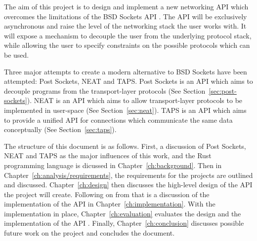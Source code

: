 \documentclass{l4proj}
\begin{document}
The aim of this project is to design and implement a new networking API which overcomes the limitations of the BSD
Sockets API .
The API will be exclusively asynchronous and raise the level of the networking stack the user works with.
It will expose a mechanism to decouple the user from the underlying protocol stack, while allowing the user to specify
constraints on the possible protocols which can be used.

Three major attempts to create a modern alternative to BSD Sockets have been attempted: Post Sockets, NEAT and TAPS.
Post Sockets is an API which aims to decouple programs from the transport-layer protocols
(See Section~\ref{sec:post-sockets}).
NEAT is an API which aims to allow transport-layer protocols to be implemented in user-space
(See Section~\ref{sec:neat}).
TAPS is an API which aims to provide a unified API for connections which communicate the same data conceptually
(See Section~\ref{sec:taps}).

The structure of this document is as follows.
First, a discussion of Post Sockets, NEAT and TAPS as the major influences of this work, and the Rust programming
language is dicussed in Chapter~\ref{ch:background}.
Then in Chapter~\ref{ch:analysis/requirements}, the requirements for the projects are outlined and discussed.
Chapter~\ref{ch:design} then discusses the high-level design of the API the project will create.
Following on from that is a discussion of the implementation of the API in Chapter~\ref{ch:implementation}.
With the implementation in place, Chapter~\ref{ch:evaluation} evaluates the design and the implementation of the API .
Finally, Chapter~\ref{ch:conclusion} discusses possible future work on the project and concludes the document.
\end{document}
